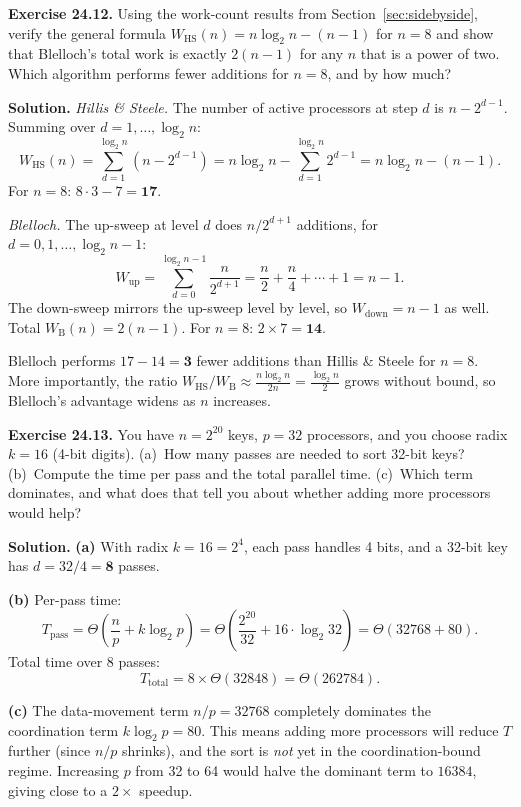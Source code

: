 \begin{ppexercises}
\textbf{Exercise 24.12.} Using the work-count results from
Section~\ref{sec:sidebyside}, verify the general formula
$W_{\mathrm{HS}}(n) = n\log_2 n - (n-1)$ for $n = 8$ and show that
Blelloch's total work is exactly $2(n-1)$ for any $n$ that is a power
of two. Which algorithm performs fewer additions for $n = 8$, and by
how much?

\medskip
\textbf{Solution.}
\emph{Hillis \& Steele.} The number of active processors at step $d$ is
$n - 2^{d-1}$. Summing over $d = 1,\ldots,\log_2 n$:
\[
W_{\mathrm{HS}}(n) = \sum_{d=1}^{\log_2 n}(n-2^{d-1})
= n\log_2 n - \sum_{d=1}^{\log_2 n}2^{d-1}
= n\log_2 n - (n-1).
\]
For $n=8$: $8 \cdot 3 - 7 = \mathbf{17}$.

\emph{Blelloch.} The up-sweep at level $d$ does $n/2^{d+1}$ additions,
for $d = 0, 1, \ldots, \log_2 n - 1$:
\[
W_{\mathrm{up}} = \sum_{d=0}^{\log_2 n - 1}\frac{n}{2^{d+1}}
= \frac{n}{2}+\frac{n}{4}+\cdots+1 = n-1.
\]
The down-sweep mirrors the up-sweep level by level, so
$W_{\mathrm{down}} = n-1$ as well. Total $W_{\mathrm{B}}(n) = 2(n-1)$.
For $n=8$: $2 \times 7 = \mathbf{14}$.

Blelloch performs $17 - 14 = \mathbf{3}$ fewer additions than
Hillis \& Steele for $n=8$. More importantly, the ratio
$W_{\mathrm{HS}} / W_{\mathrm{B}} \approx \frac{n \log_2 n}{2n}
= \frac{\log_2 n}{2}$ grows without bound, so Blelloch's advantage
widens as $n$ increases.
\end{ppexercises}

\begin{ppexercises}
\textbf{Exercise 24.13.} You have $n = 2^{20}$ keys, $p = 32$
processors, and you choose radix $k = 16$ (4-bit digits). (a)~How many
passes are needed to sort 32-bit keys? (b)~Compute the time per pass
and the total parallel time. (c)~Which term dominates, and what does
that tell you about whether adding more processors would help?

\medskip
\textbf{Solution.}
\textbf{(a)} With radix $k = 16 = 2^4$, each pass handles 4 bits, and
a 32-bit key has $d = 32/4 = \mathbf{8}$ passes.

\textbf{(b)} Per-pass time:
\[
T_{\mathrm{pass}} = \Theta\!\left(\frac{n}{p} + k\log_2 p\right)
= \Theta\!\left(\frac{2^{20}}{32} + 16 \cdot \log_2 32\right)
= \Theta(32768 + 80).
\]
Total time over 8 passes:
\[
T_{\mathrm{total}} = 8 \times \Theta(32848) = \Theta(262784).
\]

\textbf{(c)} The data-movement term $n/p = 32768$ completely dominates
the coordination term $k\log_2 p = 80$. This means adding more
processors will reduce $T$ further (since $n/p$ shrinks), and
the sort is \emph{not} yet in the coordination-bound regime.
Increasing $p$ from 32 to 64 would halve the dominant term to $16384$,
giving close to a $2\times$ speedup.
\end{ppexercises}

